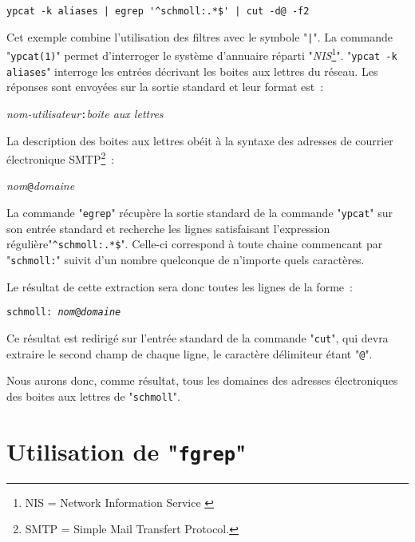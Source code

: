 \begin{example}
\begin{verbatim}
ypcat -k aliases | egrep '^schmoll:.*$' | cut -d@ -f2
\end{verbatim}
\vspace{2ex}
Cet exemple combine l'utilisation des filtres avec le symbole "\verb=|=".
La commande "{\tt ypcat(1)}" permet d'interroger le syst{\`e}me d'annuaire
r{\'e}parti "{\sl NIS}\footnote{NIS = Network Information Service
\cite{nfs-nis-automnt}}". "{\tt ypcat -k aliases}" interroge les
entr{\'e}es d{\'e}crivant les boites aux lettres du r{\'e}seau. Les r{\'e}ponses sont envoy{\'e}es
sur la sortie standard et leur format est~:\\[1ex]
\centerline{{\sl nom-utilisateur}{\tt :}{\sl boite aux lettres}}

\vspace{2ex}
La description des boites aux lettres ob{\'e}it {\`a} la syntaxe des adresses
de courrier {\'e}lectronique SMTP\footnote{SMTP = Simple Mail Transfert
Protocol.}~:\\[1ex]
\centerline{{\sl nom}{\tt @}{\sl domaine}}

\vspace{2ex}
La commande "{\tt egrep}" r{\'e}cup{\`e}re la sortie standard de la commande
"{\tt ypcat}" sur son entr{\'e}e standard et recherche les lignes
satisfaisant l'expression r{\'e}guli{\`e}re"\verb=^schmoll:.*$=". Celle-ci
correspond {\`a} toute chaine commencant par "{\tt schmoll:}" suivit
d'un nombre quelconque de n'importe quels caract{\`e}res.

Le r{\'e}sultat de cette extraction sera donc toutes les lignes de la
forme~:\\[1ex]
\centerline{{\tt schmoll: {\sl nom}@{\sl domaine}}}

\vspace{2ex}
Ce r{\'e}sultat est redirig{\'e} sur l'entr{\'e}e standard de la commande "{\tt cut}",
qui devra extraire le second champ de chaque ligne, le caract{\`e}re d{\'e}limiteur
{\'e}tant "{\tt @}".

Nous aurons donc, comme r{\'e}sultat, tous les domaines des adresses
{\'e}lectroniques des boites aux lettres de "{\tt schmoll}".
\end{example}

\section{Utilisation de "{\tt fgrep}"}

